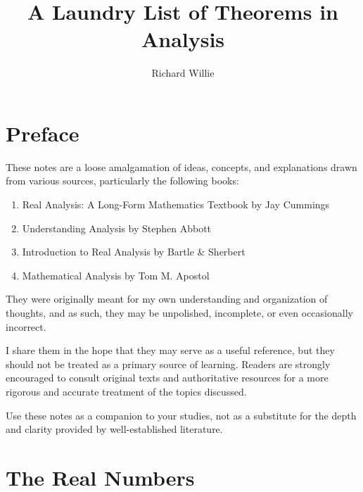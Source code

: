 \documentclass[11pt,twoside=off,numbers=noenddot]{scrbook}
\title{A Laundry List of Theorems in Analysis}
\author{Richard Willie}
\begin{document}
\maketitle

\chapter*{Preface}
These notes are a loose amalgamation of ideas, concepts, and explanations drawn from various sources, particularly the following books:
\begin{enumerate}
    \item Real Analysis: A Long-Form Mathematics Textbook by Jay Cummings \cite{cummings2019real}
    \item Understanding Analysis by Stephen Abbott \cite{abbott2015understanding}
    \item Introduction to Real Analysis by Bartle \& Sherbert \cite{bartle2011introduction}
    \item Mathematical Analysis by Tom M. Apostol \cite{apostol1974mathematical}
\end{enumerate}
They were originally meant for my own understanding and organization of thoughts, and as such, they may be unpolished, incomplete, or even occasionally incorrect.

I share them in the hope that they may serve as a useful reference, but they should not be treated as a primary source of learning. Readers are strongly encouraged to consult original texts and authoritative resources for a more rigorous and accurate treatment of the topics discussed.

Use these notes as a companion to your studies, not as a substitute for the depth and clarity provided by well-established literature.

\tableofcontents

\chapter{The Real Numbers}
\end{document}
